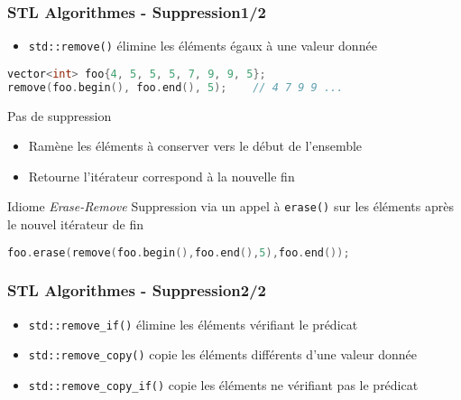 \documentclass[C++.tex]{subfiles}
\begin{document}
\begin{frame}[fragile]
	\frametitle{STL Algorithmes - Suppression\titlehfill{}1/2}
	\begin{itemize}
		\item \lstinline|std::remove()| \og élimine\fg{} les éléments égaux à une valeur donnée
	\end{itemize}

	\begin{lstlisting}[language=C++]
vector<int> foo{4, 5, 5, 5, 7, 9, 9, 5};
remove(foo.begin(), foo.end(), 5);    // 4 7 9 9 ...\end{lstlisting}


	\pause

	\begin{alertblock}{Pas de suppression}
		\begin{itemize}
			\item Ramène les éléments à conserver vers le début de l'ensemble
			\item Retourne l'itérateur correspond à la nouvelle fin
		\end{itemize}
	\end{alertblock}


	\pause

	\begin{block}{Idiome \textit{Erase-Remove}}
		Suppression via un appel à \lstinline|erase()| sur les éléments après le nouvel itérateur de fin
	
		\begin{lstlisting}[language=C++]
foo.erase(remove(foo.begin(),foo.end(),5),foo.end());\end{lstlisting}
	\end{block}
\end{frame}

\begin{frame}[fragile]
	\frametitle{STL Algorithmes - Suppression\titlehfill{}2/2}
	\begin{itemize}
		\item \lstinline|std::remove_if()| \og élimine\fg{} les éléments vérifiant le prédicat
		\item \lstinline|std::remove_copy()| copie les éléments différents d'une valeur donnée
		\item \lstinline|std::remove_copy_if()| copie les éléments ne vérifiant pas le prédicat
	\end{itemize}
\end{frame}
\end{document}
